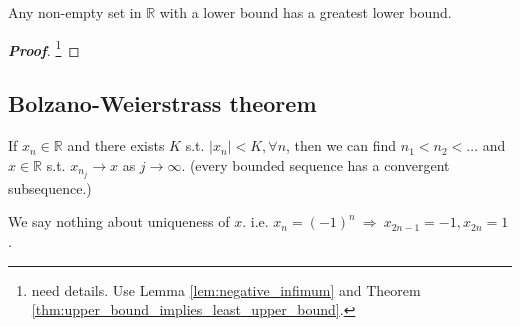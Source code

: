 \begin{theorem}\label{thm:lower_bound_implies_greatest_lower_bound}
Any non-empty set in $\mathbb{R}$ with a lower bound has a greatest lower bound.
\end{theorem}

\begin{proof}[\bf Proof]
\footnote{need details. Use Lemma \ref{lem:negative_infimum} and Theorem \ref{thm:upper_bound_implies_least_upper_bound}.}
\end{proof}



\subsection{Bolzano-Weierstrass theorem}

\begin{theorem}\label{thm:bolzano_weierstrass_r}
If $x_n\in\mathbb{R}$ and there exists $K$ s.t. $|x_n|<K,\forall n$, then we can find $n_1<n_2<\dots$ and $x\in\mathbb{R}$ s.t. $x_{n_j}\to x$ as $j\to \infty$. (every bounded sequence has a convergent subsequence.)
\end{theorem}

\begin{remark}
We say nothing about uniqueness of $x$. i.e. $x_n=(-1)^n\ \Rightarrow \ x_{2n-1}=-1,x_{2n}=1$.
\end{remark}

